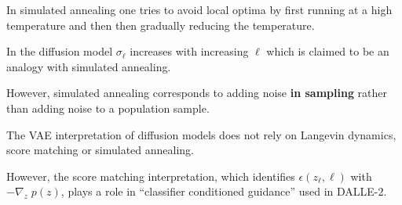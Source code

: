 {

In simulated annealing one tries to avoid local optima by first running at a high temperature and then then gradually reducing the temperature.

\vfill
In the diffusion model $\sigma_\ell$ increases with increasing $\ell$ which is claimed to be an analogy with simulated annealing.

\vfill
However, simulated annealing corresponds to adding noise {\bf in sampling} rather than adding noise to a population sample.


The VAE interpretation of diffusion models does not rely on Langevin dynamics, score matching or simulated annealing.

\vfill
However, the score matching interpretation, which identifies $\epsilon(z_\ell,\ell)$ with $- \nabla_z\; p(z)$,
plays a role in ``classifier conditioned guidance'' used in DALLE-2.

}

